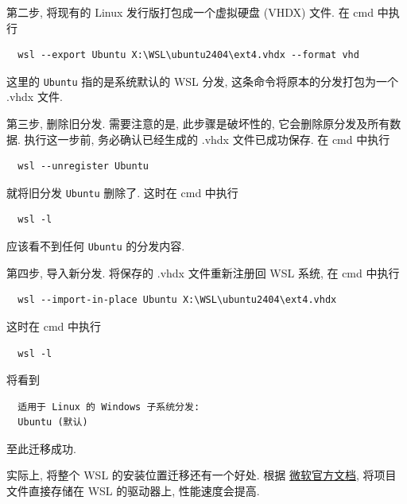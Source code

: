 第二步,
将现有的 Linux 发行版打包成一个虚拟硬盘 (VHDX) 文件.
在 \textsf{cmd} 中执行
\begin{lstlisting}
  wsl --export Ubuntu X:\WSL\ubuntu2404\ext4.vhdx --format vhd
\end{lstlisting}
这里的 \texttt{Ubuntu} 指的是系统默认的 WSL 分发,
这条命令将原本的分发打包为一个 .vhdx 文件.

第三步,
删除旧分发.
需要注意的是,
此步骤是破坏性的,
它会删除原分发及所有数据.
执行这一步前,
务必确认已经生成的 .vhdx 文件已成功保存.
在 \textsf{cmd} 中执行
\begin{lstlisting}
  wsl --unregister Ubuntu
\end{lstlisting}
就将旧分发 \texttt{Ubuntu} 删除了.
这时在 \textsf{cmd} 中执行
\begin{lstlisting}
  wsl -l
\end{lstlisting}
应该看不到任何 \texttt{Ubuntu} 的分发内容.

第四步,
导入新分发.
将保存的 .vhdx 文件重新注册回 WSL 系统,
在 \textsf{cmd} 中执行
\begin{lstlisting}
  wsl --import-in-place Ubuntu X:\WSL\ubuntu2404\ext4.vhdx
\end{lstlisting}
这时在 \textsf{cmd} 中执行
\begin{lstlisting}
  wsl -l
\end{lstlisting}
将看到
\begin{lstlisting}
  适用于 Linux 的 Windows 子系统分发:
  Ubuntu (默认)
\end{lstlisting}
至此迁移成功.

实际上,
将整个 WSL 的安装位置迁移还有一个好处.
根据%
\href{https://learn.microsoft.com/zh-cn/windows/wsl/filesystems#file-storage-and-performance-across-file-systems}{微软官方文档},
将项目文件直接存储在 WSL 的驱动器上,
性能速度会提高.
